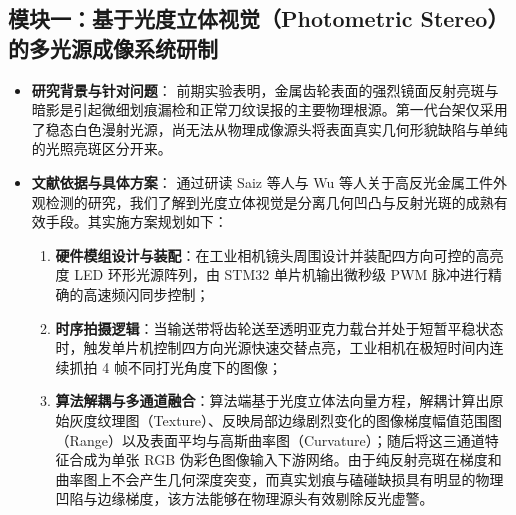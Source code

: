 \subsection*{模块一：基于光度立体视觉（Photometric Stereo）的多光源成像系统研制}
\begin{itemize}
    \item \textbf{研究背景与针对问题}：
    前期实验表明，金属齿轮表面的强烈镜面反射亮斑与暗影是引起微细划痕漏检和正常刀纹误报的主要物理根源。第一代台架仅采用了稳态白色漫射光源，尚无法从物理成像源头将表面真实几何形貌缺陷与单纯的光照亮斑区分开来。
    \item \textbf{文献依据与具体方案}：
    通过研读 Saiz 等人与 Wu 等人关于高反光金属工件外观检测的研究，我们了解到光度立体视觉是分离几何凹凸与反射光斑的成熟有效手段。其实施方案规划如下：
    \begin{enumerate}
        \item \textbf{硬件模组设计与装配}：在工业相机镜头周围设计并装配四方向可控的高亮度 LED 环形光源阵列，由 STM32 单片机输出微秒级 PWM 脉冲进行精确的高速频闪同步控制；
        \item \textbf{时序拍摄逻辑}：当输送带将齿轮送至透明亚克力载台并处于短暂平稳状态时，触发单片机控制四方向光源快速交替点亮，工业相机在极短时间内连续抓拍 4 帧不同打光角度下的图像；
        \item \textbf{算法解耦与多通道融合}：算法端基于光度立体法向量方程，解耦计算出原始灰度纹理图（Texture）、反映局部边缘剧烈变化的图像梯度幅值范围图（Range）以及表面平均与高斯曲率图（Curvature）；随后将这三通道特征合成为单张 RGB 伪彩色图像输入下游网络。由于纯反射亮斑在梯度和曲率图上不会产生几何深度突变，而真实划痕与磕碰缺损具有明显的物理凹陷与边缘梯度，该方法能够在物理源头有效剔除反光虚警。
    \end{enumerate}
\end{itemize}

